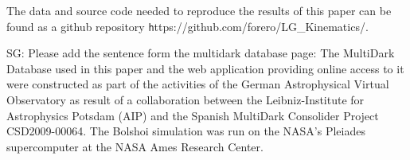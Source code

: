 \documentclass{emulateapj}
\begin{document}
The data and source code needed to reproduce the results of this paper can be found as a github repository {\texttt https://github.com/forero/LG\_Kinematics/}. 

SG: Please add the sentence form the multidark database page:
The MultiDark Database used in this paper and the web application providing online access to it were constructed as part of the activities of the German Astrophysical Virtual Observatory as result of a collaboration between the Leibniz-Institute for Astrophysics Potsdam (AIP) and the Spanish MultiDark Consolider Project CSD2009-00064. The Bolshoi simulation was run on the NASA's Pleiades supercomputer at the NASA Ames Research Center.


 
\end{document}
